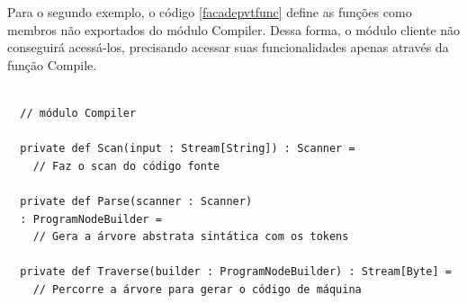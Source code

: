 Para o segundo exemplo, o código \ref{facadepvtfunc} define 
as funções como membros não exportados do módulo Compiler. 
Dessa forma, o módulo cliente não conseguirá acessá-los, 
precisando acessar suas funcionalidades apenas através da 
função Compile.

\begin{lstlisting}[caption={Função de acesso Compile},label=facadepvtfunc]
    
  // módulo Compiler    

  private def Scan(input : Stream[String]) : Scanner = 
    // Faz o scan do código fonte

  private def Parse(scanner : Scanner)
  : ProgramNodeBuilder = 
    // Gera a árvore abstrata sintática com os tokens

  private def Traverse(builder : ProgramNodeBuilder) : Stream[Byte] = 
    // Percorre a árvore para gerar o código de máquina
    
\end{lstlisting}

